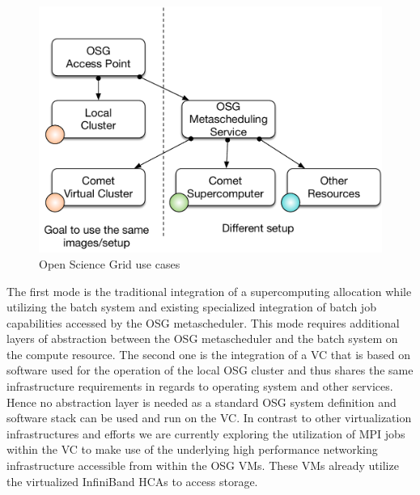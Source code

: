 \begin{figure}[htb]
  \centering
    \includegraphics[width=1.0\columnwidth]{images/osg.pdf}
    \caption{Open Science Grid use cases}
    \label{F:osg}
\end{figure}

The first mode is the traditional integration of a supercomputing
allocation while utilizing the batch system and existing specialized
integration of batch job capabilities accessed by the OSG
metascheduler. This mode requires additional layers of abstraction
between the OSG metascheduler and the batch system on the compute
resource. The second one is the integration of a VC
that is based on software used for the operation of the local OSG
cluster and thus shares the same infrastructure requirements in
regards to operating system and other services. Hence no abstraction layer is
needed as a standard OSG system definition and software stack can be
used and run on the VC.  In contrast to other virtualization infrastructures and
efforts we are currently exploring the utilization of MPI jobs within
the VC to make use of the underlying high performance
networking infrastructure accessible from within the OSG VMs. These
VMs already utilize the virtualized InfiniBand HCAs to access storage.
